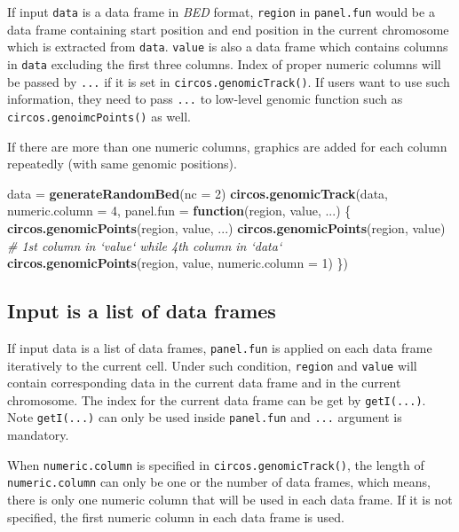 \documentclass[]{book}
\newenvironment{Shaded}{\begin{snugshade}}{\end{snugshade}}
\newcommand{\KeywordTok}[1]{\textcolor[rgb]{0.13,0.29,0.53}{\textbf{#1}}}
\newcommand{\DataTypeTok}[1]{\textcolor[rgb]{0.13,0.29,0.53}{#1}}
\newcommand{\DecValTok}[1]{\textcolor[rgb]{0.00,0.00,0.81}{#1}}
\newcommand{\StringTok}[1]{\textcolor[rgb]{0.31,0.60,0.02}{#1}}
\newcommand{\CommentTok}[1]{\textcolor[rgb]{0.56,0.35,0.01}{\textit{#1}}}
\newcommand{\ControlFlowTok}[1]{\textcolor[rgb]{0.13,0.29,0.53}{\textbf{#1}}}
\newcommand{\NormalTok}[1]{#1}
\theoremstyle{definition}
\theoremstyle{definition}
\theoremstyle{remark}
\begin{document}
If input \texttt{data} is a data frame in \emph{BED} format,
\texttt{region} in \texttt{panel.fun} would be a data frame containing
start position and end position in the current chromosome which is
extracted from \texttt{data}. \texttt{value} is also a data frame which
contains columns in \texttt{data} excluding the first three columns.
Index of proper numeric columns will be passed by \texttt{...} if it is
set in \texttt{circos.genomicTrack()}. If users want to use such
information, they need to pass \texttt{...} to low-level genomic
function such as \texttt{circos.genoimcPoints()} as well.

If there are more than one numeric columns, graphics are added for each
column repeatedly (with same genomic positions).

\begin{Shaded}
\begin{Highlighting}[]
\NormalTok{data =}\StringTok{ }\KeywordTok{generateRandomBed}\NormalTok{(}\DataTypeTok{nc =} \DecValTok{2}\NormalTok{)}
\KeywordTok{circos.genomicTrack}\NormalTok{(data, }\DataTypeTok{numeric.column =} \DecValTok{4}\NormalTok{, }
    \DataTypeTok{panel.fun =} \ControlFlowTok{function}\NormalTok{(region, value, ...) \{}
        \KeywordTok{circos.genomicPoints}\NormalTok{(region, value, ...)}
        \KeywordTok{circos.genomicPoints}\NormalTok{(region, value)}
        \CommentTok{# 1st column in `value` while 4th column in `data`}
        \KeywordTok{circos.genomicPoints}\NormalTok{(region, value, }\DataTypeTok{numeric.column =} \DecValTok{1}\NormalTok{)}
\NormalTok{\})}
\end{Highlighting}
\end{Shaded}

\subsection{Input is a list of data
frames}\label{input-is-a-list-of-data-frames}

If input data is a list of data frames, \texttt{panel.fun} is applied on
each data frame iteratively to the current cell. Under such condition,
\texttt{region} and \texttt{value} will contain corresponding data in
the current data frame and in the current chromosome. The index for the
current data frame can be get by \texttt{getI(...)}. Note
\texttt{getI(...)} can only be used inside \texttt{panel.fun} and
\texttt{...} argument is mandatory.

When \texttt{numeric.column} is specified in
\texttt{circos.genomicTrack()}, the length of \texttt{numeric.column}
can only be one or the number of data frames, which means, there is only
one numeric column that will be used in each data frame. If it is not
specified, the first numeric column in each data frame is used.
\end{document}
